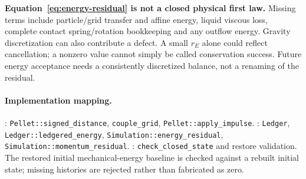 \textbf{Equation~\eqref{eq:energy-residual} is not a closed physical first law.}
Missing terms include particle/grid transfer and affine energy, liquid viscous
loss, complete contact spring/rotation bookkeeping and any outflow energy.
Gravity discretization can also contribute a defect. A small $r_E$ alone could
reflect cancellation; a nonzero value cannot simply be called conservation
success. Future energy acceptance needs a consistently discretized balance,
not a renaming of the residual.

\paragraph{Implementation mapping.}
: \nolinkurl{Pellet::signed_distance},
\nolinkurl{couple_grid}, \nolinkurl{Pellet::apply_impulse}.
: \nolinkurl{Ledger},
\nolinkurl{Ledger::ledgered_energy}, \nolinkurl{Simulation::energy_residual},
\nolinkurl{Simulation::momentum_residual}.
: \nolinkurl{check_closed_state} and restore validation.
The restored initial mechanical-energy baseline is checked against a rebuilt
initial state; missing histories are rejected rather than fabricated as zero.
